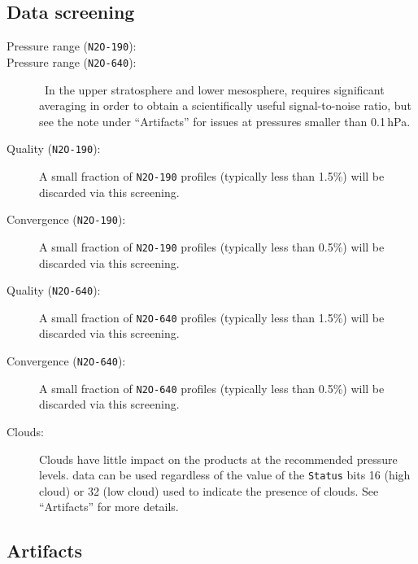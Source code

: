 \begin{nofloatpages}
\subsection{Data screening}
\label{sec:N2OScreening}
\begin{description}
  \item[Pressure range (\texttt{N2O-190}):] 
  \item[Pressure range (\texttt{N2O-640}):]  \standardrangestatement\ In the upper stratosphere and lower mesosphere, \thisv {} requires significant averaging in order to obtain a scientifically useful signal-to-noise ratio, but see the note under ``Artifacts'' for issues at pressures smaller than 0.1\,hPa.

    \standardprecisionrule
    \evenstatusrule

  \item[Quality (\texttt{N2O-190}):]  A small fraction of \texttt{N2O-190} profiles (typically less than 1.5\%) will be discarded via this screening.

  \item[Convergence (\texttt{N2O-190}):]  A small fraction of \texttt{N2O-190} profiles (typically less than 0.5\%) will be discarded via this screening.

  \item[Quality (\texttt{N2O-640}):]  A small fraction of \texttt{N2O-640} profiles (typically less than 1.5\%) will be discarded via this screening.

  \item[Convergence (\texttt{N2O-640}):]  A small fraction of \texttt{N2O-640} profiles (typically less than 0.5\%) will be discarded via this screening.

  \item[Clouds:] Clouds have little impact on the  products at the recommended pressure levels.  data can be used regardless of the value of the \texttt{Status} bits 16 (high cloud) or 32 (low cloud) used to indicate the presence of clouds. See ``Artifacts'' for more details.

\end{description}
\end{nofloatpages}

\subsection{Artifacts}


